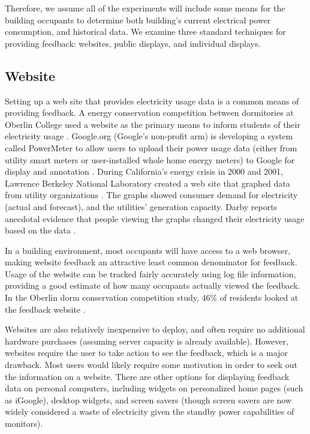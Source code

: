 \documentclass[11pt]{article}
\begin{document}
Therefore, we assume all of the experiments will include some means for the building occupants to determine both building's current electrical power consumption, and historical data. We examine three standard techniques for providing feedback: websites, public displays, and individual displays.

\subsection{Website}

Setting up a web site that provides electricity usage data is a common means of providing feedback. A energy conservation competition between dormitories at Oberlin College used a website as the primary means to inform students of their electricity usage \cite{petersen-dorm-energy-reduction}. Google.org (Google's non-profit arm) is developing a system called PowerMeter to allow users to upload their power usage data (either from utility smart meters or user-installed whole home energy meters) to Google for display and annotation \cite{Google-PowerMeter}. During California's energy crisis in 2000 and 2001, Lawrence Berkeley National Laboratory created a web site that graphed data from utility organizations \cite{Bartholomew2008Current-Energy}. The graphs showed consumer demand for electricity (actual and forecast), and the utilities' generation capacity. Darby reports anecdotal evidence that people viewing the graphs changed their electricity usage based on the data \cite{darby-review-2006}.

In a building environment, most occupants will have access to a web browser, making website feedback an attractive least common denominator for feedback. Usage of the website can be tracked fairly accurately using log file information, providing a good estimate of how many occupants actually viewed the feedback. In the Oberlin dorm conservation competition study, 46\% of residents looked at the feedback website \cite{petersen-dorm-energy-reduction}.

Websites are also relatively inexpensive to deploy, and often require no additional hardware purchases (assuming server capacity is already available). However, websites require the user to take action to see the feedback, which is a major drawback. Most users would likely require some motivation in order to seek out the information on a website. There are other options for displaying feedback data on personal computers, including widgets on personalized home pages (such as iGoogle), desktop widgets, and screen savers (though screen savers are now widely considered a waste of electricity given the standby power capabilities of monitors).
\end{document}
